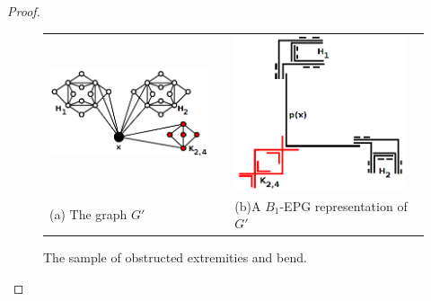 \documentclass[
submission
]{dmtcs-episciences}
\newtheorem{lemma}[theorem]{Lemma}
\newtheorem{definition}[theorem]{Definition}
\begin{document}
\begin{proof}
\begin{figure}[h]
\begin{tabular}{p{6cm} p{1cm} p{6cm}}
     \includegraphics[width=5cm, center]{grafoDobraExtremidadeObstruida2} &  &\includegraphics[width=5cm, center]{extremidadeDobraObstruida3}  \\%
    \footnotesize \centering (a) The graph $G'$& & \footnotesize \centering (b)A $B_1$-EPG representation of $G'$%
  \end{tabular}
 \caption{The sample of  obstructed extremities and bend.}\label{fig:extremidadeDobraObstruida}
\end{figure}
 \end{proof}







\end{document}
